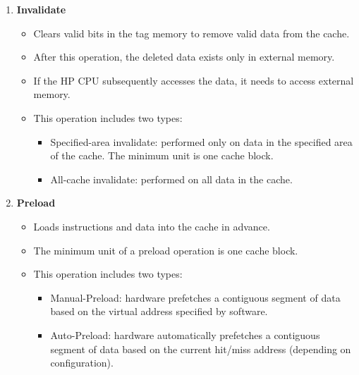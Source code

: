 \documentclass[main\_\_EN.tex]{subfiles}
\begin{document}
\begin{enumerate}
\item \textbf{Invalidate}
\begin{itemize}
    \item Clears valid bits in the tag memory to remove valid data from the cache.
    \item After this operation, the deleted data exists only in external memory.
    \item If the HP CPU subsequently accesses the data, it needs to access external memory.
    \item This operation includes two types:
    \begin{itemize}
    \item Specified-area invalidate: performed only on data in the specified area of the cache. The minimum unit is one cache block.
    \item All-cache invalidate: performed on all data in the cache.
    \end{itemize}
\end{itemize}

\item \textbf{Preload}
\begin{itemize}
    \item Loads instructions and data into the cache in advance.
    \item The minimum unit of a preload operation is one cache block.
    \item This operation includes two types:
    \begin{itemize}
    \item Manual-Preload: hardware prefetches a contiguous segment of data based on the virtual address specified by software.
    \item Auto-Preload: hardware automatically prefetches a contiguous segment of data based on the current hit/miss address (depending on configuration).
    \end{itemize}
\end{itemize}


\end{enumerate}
\end{document}

